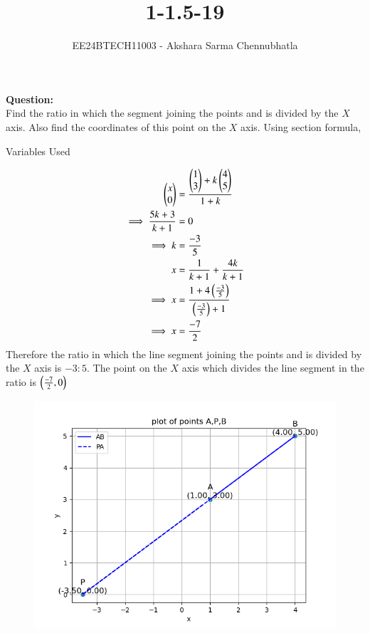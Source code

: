 \documentclass[journal]{IEEEtran}
\begin{document}

\vspace{3cm}

\title{1-1.5-19}
\author{EE24BTECH11003 - Akshara Sarma Chennubhatla}
{\let\newpage\relax\maketitle}

\renewcommand{\thefigure}{\theenumi}
\renewcommand{\thetable}{\theenumi}
\setlength{\intextsep}{10pt} %


\renewcommand{\thetable}{\theenumi}

\textbf{Question:} \\Find the ratio in which the segment joining the points  and  is divided by the $X$ axis. Also find the coordinates of this point on the $X$ axis.
Using section formula,\\
\begin{table}[h!]    
  \centering
  
  \caption{Variables Used}
  \label{tab1-1.5-19}
\end{table}
\solution
\begin{align}
\begin{pmatrix}x\\0\end{pmatrix}&=\frac{\begin{pmatrix}1\\3\end{pmatrix}+k\begin{pmatrix}4\\5\end{pmatrix}}{1+k}\\
\implies \frac{5k+3}{k+1}&=0\\
\implies k&=\frac{-3}{5}\\
x&=\frac{1}{k+1}+\frac{4k}{k+1}\\
\implies x&=\frac{1+4\left(\frac{-3}{5}\right)}{\left(\frac{-3}{5}\right)+1}\\
\implies x&=\frac{-7}{2}
\end{align}
Therefore the ratio in which the line segment joining the points  and  is divided by the $X$ axis is $-3:5$. The point on the $X$ axis which divides the line segment in the ratio is $\left(\frac{-7}{2},0\right)$
\begin{figure}[h!]
\centering
\includegraphics[width=0.7\columnwidth]{figs/figure.png}	
\label{Plot of points A,B and P and the line joining them}
\end{figure}
\end{document}
